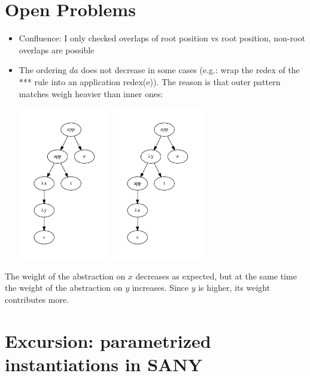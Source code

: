 \documentclass[a4paper]{article}
\begin{document}
\section{Open Problems}
\begin{itemize}
\item Confluence: I only checked overlaps of root position vs root position,
  non-root overlaps are possible
\item The ordering $da$ does not decrease in some cases (e.g.: wrap the redex of
  the *** rule into an application redex(e)). The reason is that outer pattern
  matches weigh heavier than inner ones:
  \begin{center}
    \includegraphics[width=4cm]{measure_ce1.pdf}
    \includegraphics[width=4cm]{measure_ce2.pdf}
  \end{center}
\end{itemize}

The weight of the abstraction on $x$ decreases as expected, but at the same time
 the weight of the abstraction on $y$ increases. Since $y$ is higher, its weight
 contributes more.

\section{Excursion: parametrized instantiations in SANY}
\label{sec:param-inst}
\end{document}
